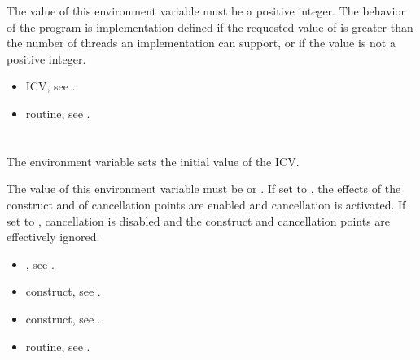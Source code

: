 The value of this environment variable must be a positive integer. The behavior of the 
program is implementation defined if the requested value of  is 
greater than the number of threads an implementation can support, or if the value is not 
a positive integer. 

\crossreferences
\begin{itemize}
\item {} ICV, see .

\item {} routine, see .
\end{itemize}









\section{}
\label{sec:OMP_CANCELLATION}
The  environment variable sets the initial value of the  
ICV.

The value of this environment variable must be  or . If set to , the 
effects of the  construct and of cancellation points are enabled and cancellation 
is activated. If set to , cancellation is disabled and the  construct and 
cancellation points are effectively ignored.

\crossreferences
\begin{itemize}
\item {}, see .

\item {} construct, see . 

\item {} construct, see .

\item {} routine, see .
\end{itemize}









